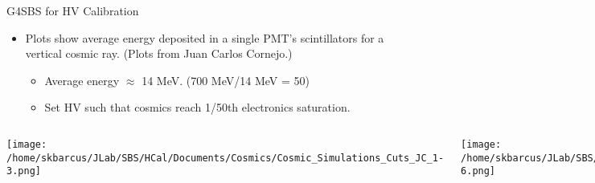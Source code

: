 \documentclass[10pt]{beamer}
\begin{document}
\begin{frame}{G4SBS for HV Calibration}
	\vspace{-2mm}
	\begin{itemize}
		\item Plots show average energy deposited in a single PMT's scintillators for a vertical cosmic ray. (Plots from Juan Carlos Cornejo.)
		\begin{itemize}
			\item[--] Average energy $\approx$ 14 MeV. (700 MeV/14 MeV = 50)
			\item[--] \alert{Set HV such that cosmics reach 1/50th electronics saturation.}
		\end{itemize}
	\end{itemize}

    \begin{columns}[T,onlytextwidth]
	
	\vspace{-6mm}
	\begin{center}
	\texttt{[image: /home/skbarcus/JLab/SBS/HCal/Documents/Cosmics/Cosmic\_Simulations\_Cuts\_JC\_1-3.png]}
	\end{center}
	
	
	\vspace{-6mm}
	\begin{center}
	\texttt{[image: /home/skbarcus/JLab/SBS/HCal/Documents/Cosmics/Cosmic\_Simulations\_Cuts\_JC\_4-6.png]}
	\end{center}
	
	\end{columns}

\end{frame}

%
%
\end{document}
